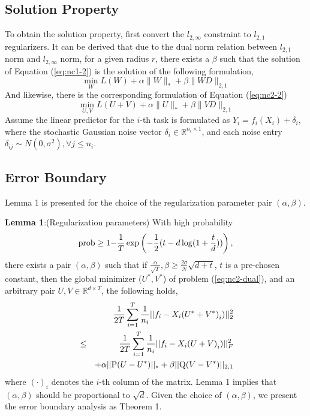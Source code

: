 \documentclass[twoside,leqno,twocolumn]{article}
\begin{document}
\subsection{Solution Property}

To obtain the solution property, first  convert
the $l_{2,\infty}$ constraint to $l_{2,1}$ regularizers. 
It can be derived that due to the dual norm relation between $l_{2,1}$ norm and $l_{2,\infty}$ norm, for a given radius $r$, there exists a $\beta$
such that the solution of Equation (\ref{eq:nc1-2}) is the solution
of the following formulation,
%
\begin{equation}
\mathop {\min }\limits_W L(W)+\alpha\|W\|_{*}+\beta\|WD\|_{2,1}
\label{eq:nc1-dual}
\end{equation}
And likewise, there is the corresponding formulation of Equation (\ref{eq:nc2-2}) 
%
\begin{equation}
\mathop {\min }\limits_{U,V} L(U+V) +\alpha\|U\|_{*}+\beta\|VD\|_{2,1}
\label{eq:nc2-dual}
\end{equation}
%
Assume the linear predictor for the $i$-th task is formulated as
$
{Y_i} = {f_i}({X_i}) + {\delta _i},
$
where  the stochastic Gaussian noise vector ${\delta _i} \in {\mathbb{R}^{{n_i \times 1}}}$, and each noise entry ${\delta _{ij}} \sim N(0,{\sigma ^2}),\forall j \le {n_i}$. 

\subsection{Error Boundary}

Lemma 1 is presented for the choice of the regularization parameter pair $(\alpha, \beta)$.

\noindent \textbf{Lemma 1}:(Regularization parameters) With high probability
\begin{equation}
{\rm {prob}}\ge{\rm {1-}}\frac{1}{T}\exp\left({-\frac{1}{2}(t-d\log(1+\frac{t}{d}))}\right),
\end{equation}
%
there exists a pair $(\alpha, \beta)$ such that if $\frac{\alpha }{{\sqrt T }},\beta  \ge \frac{{2\sigma }}{N}\sqrt {d + t} $, $t$ is a pre-chosen constant, then the global minimizer ($U^*, V^*$) of problem (\ref{eq:nc2-dual}), and an arbitrary pair $U,V \in {\mathbb{R}^{d \times T}}$, the following holds,
%
\begin{eqnarray}
&& \frac{1}{{2T}}\sum\limits_{i = 1}^T {\frac{1}{{{n_i}}}||{f_i} - {X_i}{{(U^* + V^*)}_i})||_2^2} \\
\nonumber
&\le & \frac{1}{{2T}}\sum\limits_{i = 1}^T {\frac{1}{{{n_i}}}||{f_i} - {X_i}{{(U + V)}_i})||_F^2} \\
\nonumber
&& { + \alpha ||{\rm P}(U - U^*)|{|_*} + \beta ||{\rm Q}(V - V^*)|{|_{2,1}}}
\end{eqnarray}
%
where $(\cdot)_{i}$ denotes the $i$-th column of the matrix. Lemma 1 implies that $(\alpha, \beta)$ should be proportional to $\sqrt{d}$. Given the choice of $(\alpha, \beta)$, we present the error boundary analysis as Theorem 1.
\end{document}
